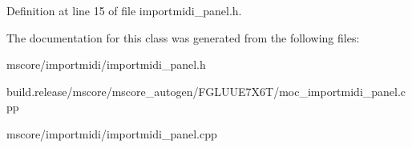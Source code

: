 Definition at line 15 of file importmidi\+\_\+panel.\+h.



The documentation for this class was generated from the following files\+:\begin{DoxyCompactItemize}
\item 
mscore/importmidi/importmidi\+\_\+panel.\+h\item 
build.\+release/mscore/mscore\+\_\+autogen/\+F\+G\+L\+U\+U\+E7\+X6\+T/moc\+\_\+importmidi\+\_\+panel.\+cpp\item 
mscore/importmidi/importmidi\+\_\+panel.\+cpp\end{DoxyCompactItemize}
